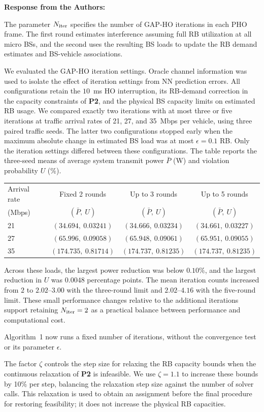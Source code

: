 \documentclass[11pt]{article}
\newenvironment{reviewedit}[1]
{\colorlet{responseblue}{#1}\colorlet{changeblue}{#1}\color{#1}}
{}
\newenvironment{authorresponse}
{\par\Needspace{3\baselineskip}\noindent\textcolor{responseblue}{\textbf{Response from the Authors:}}\par\nobreak\color{responseblue}}
{\par}
\begin{document}
\begin{reviewedit}{blue}
\begin{authorresponse}
The parameter $N_{\rm iter}$ specifies the number of GAP-HO iterations in
each PHO frame. The first round estimates interference assuming full RB
utilization at all micro BSs, and the second uses the resulting BS loads
to update the RB demand estimates and BS-vehicle associations.
{\color{blue}
We evaluated the GAP-HO iteration settings. Oracle channel information
was used to isolate the effect of iteration settings from NN prediction errors.
All configurations retain the $10$~ms HO interruption, its RB-demand correction
in the capacity constraints of \textbf{P2}, and the physical BS capacity limits
on estimated RB usage.
We compared exactly two iterations with at most three or five iterations at traffic arrival rates of 21, 27, and 35~Mbps per vehicle, using three paired traffic seeds.
The latter two configurations stopped early when the maximum absolute change
in estimated BS load was at most $\epsilon=0.1$ RB. Only the iteration settings
differed between these configurations. The table reports the three-seed means of
average system transmit power $\bar{P}$ (W) and violation probability $U$ (\%).
\begin{center}
\small
\begin{tabular}{lccc}
\hline
Arrival rate & Fixed 2 rounds & Up to 3 rounds & Up to 5 rounds \\
(Mbps) & $(\bar{P},\ U)$ & $(\bar{P},\ U)$ & $(\bar{P},\ U)$ \\
\hline
21 & $(34.694,\ 0.03241)$ & $(34.666,\ 0.03234)$ & $(34.661,\ 0.03227)$ \\
27 & $(65.996,\ 0.09058)$ & $(65.948,\ 0.09061)$ & $(65.951,\ 0.09055)$ \\
35 & $(174.735,\ 0.81714)$ & $(174.737,\ 0.81235)$ & $(174.737,\ 0.81235)$ \\
\hline
\end{tabular}
\end{center}
Across these loads, the largest power reduction was below $0.10\%$, and the
largest reduction in $U$ was $0.0048$ percentage points. The mean iteration
counts increased from $2$ to $2.02$--$3.00$ with the three-round limit and
$2.02$--$4.16$ with the five-round limit. These small performance changes
relative to the additional iterations support retaining $N_{\rm iter}=2$
as a practical balance between performance and computational cost.\par}
Algorithm~1 now runs a fixed number of iterations, without the convergence
test or its parameter $\epsilon$.

The factor $\zeta$ controls the step size for relaxing the RB capacity bounds
when the continuous relaxation of \textbf{P2} is infeasible. We use $\zeta=1.1$
to increase these bounds by 10\% per step, balancing the relaxation step size against the
number of solver calls. This relaxation is used to obtain an assignment
before the final procedure for restoring feasibility; it does not increase the
physical RB capacities.


\end{authorresponse}
\end{reviewedit}
\end{document}
